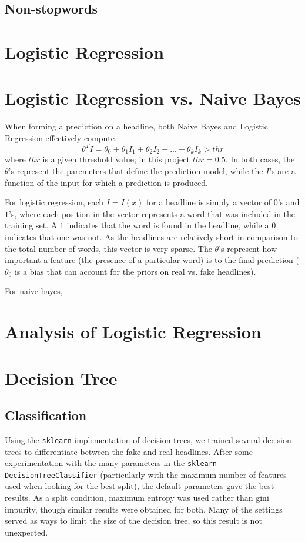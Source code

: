 \documentclass{article}
\begin{document}
 \subsection{Non-stopwords}

   \section{Logistic Regression}



   \section{Logistic Regression vs. Naive Bayes}
   When forming a prediction on a headline, both Naive Bayes and Logistic Regression effectively compute
   \begin{equation*}
      \theta^T I = \theta_0 + \theta_1 I_1 + \theta_2 I_2 + ... + \theta_k I_k > thr
   \end{equation*}
   where $thr$ is a given threshold value; in this project $thr = 0.5$. In both cases, the $\theta$'s represent
   the paremeters that define the prediction model, while the $I$'s are a function of the input for which a
   prediction is produced.

   For logistic regression, each $I = I(x)$ for a headline is simply a vector of $0$'s and $1$'s, where each
   position in the vector represents a word that was included in the training set. A $1$ indicates that the
   word is found in the headline, while a $0$ indicates that one was not. As the headlines are relatively short
   in comparison to the total number of words, this vector is very sparse. The $\theta$'s represent how important
   a feature (the presence of a particular word) is to the final prediction ($\theta_0$ is a bias that can
   account for the priors on real vs. fake headlines).

   For naive bayes,



   \section{Analysis of Logistic Regression}



   \section{Decision Tree}
   \subsection{Classification}
   Using the \texttt{sklearn} implementation of decision trees, we trained several decision trees
   to differentiate between the fake and real headlines. After some experimentation with the many parameters
   in the \texttt{sklearn DecisionTreeClassifier} (particularly with the maximum number of features used
   when looking for the best split), the default parameters gave the best results. As a split condition,
   maximum entropy was used rather than gini impurity, though similar results were obtained for both.
   Many of the settings served as ways to limit the size of the decision tree, so this result is not unexpected.
\end{document}
